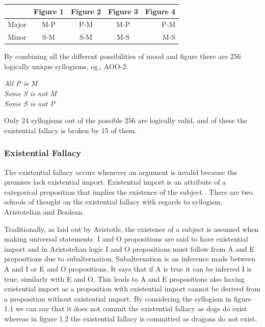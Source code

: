 \documentclass[12pt,a4paper]{report}
\newenvironment{tightcenter}{%
  \setlength\topsep{0pt}
  \setlength\parskip{0pt}
  \begin{center}
}{%
  \end{center}
}
\begin{document}
\begin{center}
  \begin{tabular}{ l | c | c | c | r }
     & Figure 1 & Figure 2 & Figure 3 & Figure 4 \\ \hline
    Major & M-P & P-M & M-P & P-M \\ \hline
    Minor & S-M & S-M & M-S & M-S \\
  \end{tabular}
\end{center}

By combining all the different possibilities of mood and figure there are 256 logically unique syllogisms, eg., AOO-2. 
\bigbreak
\begin{tightcenter}
\textit{All P is M}\\ 
\textit{Some S is not M}\\
\textit{Some S is not P}\\
\end{tightcenter}
\bigbreak

Only 24 syllogisms out of the possible 256 are logically valid, and of these the existential fallacy is broken by 15 of them.

\subsubsection{Existential Fallacy}

The existential fallacy occurs whenever an argument is invalid because the premises lack existential import. Existential import is an attribute of a categorical proposition that implies the existence of the subject \citep{hurley2005concise}. There are two schools of thought on the existential fallacy with regards to syllogism, Aristotelian and Boolean.

Traditionally, as laid out by Aristotle, the existence of a subject is assumed when making universal statements. I and O propositions are said to have existential import and in Aristotelian logic I and O propositions must follow from A and E propositions due to subalternation. Subalternation is an inference made between A and I or E and O propositions. It says that if A is true it can be inferred I is true, similarly with E and O. This leads to A and E propositions also having existential import as a proposition with existential import cannot be derived from a proposition without existential import.
By considering the syllogism in figure 1.1 we can say that it does not commit the existential fallacy as dogs do exist whereas in figure 1.2 the existential fallacy is committed as dragons do not exist. 
\end{document}
